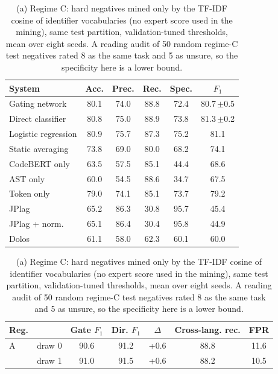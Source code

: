 \begin{table}[t]
\centering
\caption{(a) Regime C: hard negatives mined only by the TF-IDF cosine of identifier vocabularies (no expert score used in the mining), same test partition, validation-tuned thresholds, mean over eight seeds. A reading audit of 50 random regime-C test negatives rated 8 as the same task and 5 as unsure, so the specificity here is a lower bound.}
\label{tab:regime-c}
\footnotesize
\setlength{\tabcolsep}{4pt}
\begin{tabular}{lccccc}
\toprule
\textbf{System} & Acc. & Prec. & Rec. & Spec. & $F_1$ \\
\midrule
Gating network & 80.1 & 74.0 & 88.8 & 72.4 & 80.7\,{\scriptsize$\pm$0.5} \\
Direct classifier & 80.8 & 75.0 & 88.9 & 73.8 & 81.3\,{\scriptsize$\pm$0.2} \\
Logistic regression & 80.9 & 75.7 & 87.3 & 75.2 & 81.1 \\
Static averaging & 73.8 & 69.0 & 80.0 & 68.2 & 74.1 \\
CodeBERT only & 63.5 & 57.5 & 85.1 & 44.4 & 68.6 \\
AST only & 60.0 & 54.5 & 88.6 & 34.7 & 67.5 \\
Token only & 79.0 & 74.1 & 85.1 & 73.7 & 79.2 \\
JPlag & 65.2 & 86.3 & 30.8 & 95.7 & 45.4 \\
JPlag + norm. & 65.1 & 86.4 & 30.4 & 95.8 & 44.9 \\
Dolos & 61.1 & 58.0 & 62.3 & 60.1 & 60.0 \\
\bottomrule
\end{tabular}
\par\vspace{4pt}
\label{tab:split-variance}
\par\vspace{2pt}
\footnotesize
\setlength{\tabcolsep}{2.5pt}
\begin{tabular}{llccccc}
\toprule
\textbf{Reg.} & & Gate $F_1$ & Dir. $F_1$ & $\Delta$ & Cross-lang. rec. & FPR \\
\midrule
A & draw 0 & 90.6 & 91.2 & +0.6 & 88.8 & 11.6 \\
 & draw 1 & 91.0 & 91.5 & +0.6 & 88.2 & 10.5 \\

\end{tabular}
\end{table}
